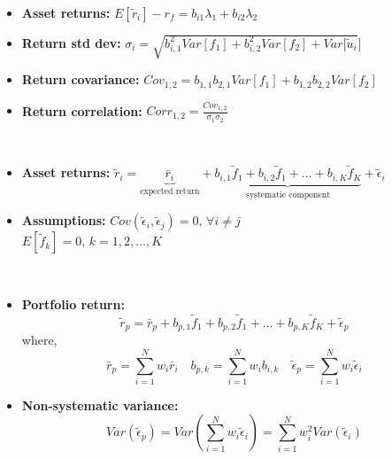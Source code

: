 \documentclass[10pt,landscape,a4paper]{article}
\begin{document}
\begin{multicols*}{3}
\begin{description}[itemsep=0pt]
\begin{itemize}
	\end{itemize}
\end{description}

\begin{description}[itemsep=0pt]
	\item[Two-factor model]  ~
	\begin{itemize}
		\item {\bf Asset returns:} $ E[\tilde{r}_i] - r_f =  b_{i1} \lambda_1 + b_{i2} \lambda_2 $
		\item {\bf Return std dev:} $ \sigma_i = \sqrt{ b_{i,1}^2 Var[f_1] +  b_{i,2}^2 Var[f_2] + Var[\tilde{u}_i}]$
		\item {\bf Return covariance:} $ Cov_{1,2} =  b_{1,1} b_{2,1} Var[f_1]  +  b_{1,2} b_{2,2} Var[f_2]$
		\item {\bf Return correlation:} $ Corr_{1,2} = \frac{Cov_{1,2}}{\sigma_1 \sigma_2}$
		
	\end{itemize}
\end{description}


\begin{description}[itemsep=0pt]
	\item[Multifactor models]  ~
	\begin{itemize}
		\item {\bf Asset returns:} $ \tilde{r}_i = \underbrace{\bar{r}_i}_{\text{expected return}} +  \underbrace{b_{i,1} \tilde{f}_1 + b_{i,2} \tilde{f}_1 + \dots + b_{i,K} \tilde{f}_K }_{\text{systematic component}}  +\tilde{\epsilon}_i $

		\item {\bf Assumptions:} 
		$Cov( \tilde{\epsilon}_i , \tilde{\epsilon}_j ) = 0 \text{, } \forall{i \neq j} $ \\
		$E[\tilde{f}_k]=0 \text{, } k=1,2, \dots , K $
		
	\end{itemize}
\end{description}

\begin{description}[itemsep=0pt]
	\item[Portfolio return]  ~
	\begin{itemize}
		\item {\bf Portfolio return:} $$ \tilde{r}_p = \bar{r}_p +  b_{p,1} \tilde{f}_1 + b_{p,2} \tilde{f}_1 + \dots + b_{p,K} \tilde{f}_K  +\tilde{\epsilon}_p $$
		where, 
		$$ \bar{r}_p = \sum_{i=1}^{N}{w_i \bar{r}_i}  \quad   b_{p,k}=\sum_{i=1}^{N}{w_i b_{i,k}} \quad  \tilde{\epsilon}_p = \sum_{i=1}^{N}{w_i \tilde{\epsilon}_i}$$
		\item {\bf Non-systematic variance:} $$ Var( \tilde{\epsilon}_p) = Var \left( \sum_{i=1}^{N}{w_i \tilde{\epsilon}_i}  \right) = \sum_{i=1}^{N}{w_i ^2 Var (\tilde{\epsilon}_i)} $$
		

\end{itemize}
\end{description}
\end{multicols*}
\end{document}
